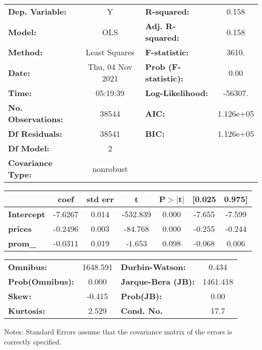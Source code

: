 \begin{center}
\begin{tabular}{lclc}
\toprule
\textbf{Dep. Variable:}    &        Y         & \textbf{  R-squared:         } &     0.158   \\
\textbf{Model:}            &       OLS        & \textbf{  Adj. R-squared:    } &     0.158   \\
\textbf{Method:}           &  Least Squares   & \textbf{  F-statistic:       } &     3610.   \\
\textbf{Date:}             & Thu, 04 Nov 2021 & \textbf{  Prob (F-statistic):} &     0.00    \\
\textbf{Time:}             &     05:19:39     & \textbf{  Log-Likelihood:    } &   -56307.   \\
\textbf{No. Observations:} &       38544      & \textbf{  AIC:               } & 1.126e+05   \\
\textbf{Df Residuals:}     &       38541      & \textbf{  BIC:               } & 1.126e+05   \\
\textbf{Df Model:}         &           2      & \textbf{                     } &             \\
\textbf{Covariance Type:}  &    nonrobust     & \textbf{                     } &             \\
\bottomrule
\end{tabular}
\begin{tabular}{lcccccc}
                   & \textbf{coef} & \textbf{std err} & \textbf{t} & \textbf{P$> |$t$|$} & \textbf{[0.025} & \textbf{0.975]}  \\
\midrule
\textbf{Intercept} &      -7.6267  &        0.014     &  -532.839  &         0.000        &       -7.655    &       -7.599     \\
\textbf{prices}    &      -0.2496  &        0.003     &   -84.768  &         0.000        &       -0.255    &       -0.244     \\
\textbf{prom\_}    &      -0.0311  &        0.019     &    -1.653  &         0.098        &       -0.068    &        0.006     \\
\bottomrule
\end{tabular}
\begin{tabular}{lclc}
\textbf{Omnibus:}       & 1648.591 & \textbf{  Durbin-Watson:     } &    0.434  \\
\textbf{Prob(Omnibus):} &   0.000  & \textbf{  Jarque-Bera (JB):  } & 1461.418  \\
\textbf{Skew:}          &  -0.415  & \textbf{  Prob(JB):          } &     0.00  \\
\textbf{Kurtosis:}      &   2.529  & \textbf{  Cond. No.          } &     17.7  \\
\bottomrule
\end{tabular}
\end{center}

Notes: \newline
 [1] Standard Errors assume that the covariance matrix of the errors is correctly specified.
